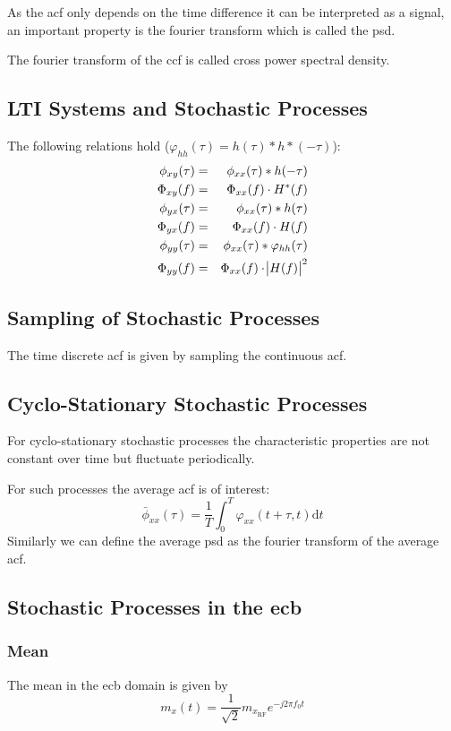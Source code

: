 As the \ac{acf} only depends on the time difference it can be interpreted as a signal,
an important property is the fourier transform which is called the \ac{psd}.

The fourier transform of the \ac{ccf} is called cross power spectral density.

\subsection{LTI Systems and Stochastic Processes}
The following relations hold ($\varphi_{hh}(\tau) = h(\tau) * h*(-\tau)$):
\begin{eqnarray}
    \phi_{xy}(\tau) &=& \phi_{xx}(\tau) * h(-\tau) \\
    \Phi_{xy}(f) &=& \Phi_{xx}(f) \cdot H^*(f) \\
    \phi_{yx}(\tau) &=& \phi_{xx}(\tau) * h(\tau) \\
    \Phi_{yx}(f) &=& \Phi_{xx}(f) \cdot H(f) \\
    \phi_{yy}(\tau) &=& \phi_{xx}(\tau) * \varphi_{hh}(\tau) \\
    \Phi_{yy}(f) &=& \Phi_{xx}(f) \cdot \abs{H(f)}^2
\end{eqnarray}

\subsection{Sampling of Stochastic Processes}
The time discrete \ac{acf} is given by sampling the continuous \ac{acf}.

\subsection{Cyclo-Stationary Stochastic Processes}
For cyclo-stationary stochastic processes the characteristic properties are not constant
over time but fluctuate periodically.

For such processes the average \ac{acf} is of interest:
\begin{equation}
    \bar{\phi}_{xx}(\tau) = \frac{1}{T} \int_0^T \varphi_{xx}(t+\tau, t) \text{d}t
\end{equation}
Similarly we can define the average \ac{psd} as the fourier transform of the average
\ac{acf}.

\subsection{Stochastic Processes in the \acl{ecb}}
\subsubsection{Mean}
The mean in the \ac{ecb} domain is given by
\begin{equation}
    m_x(t) = \frac{1}{\sqrt{2}} m_{x_\text{RF}} e^{-j 2 \pi f_0 t}
\end{equation}

